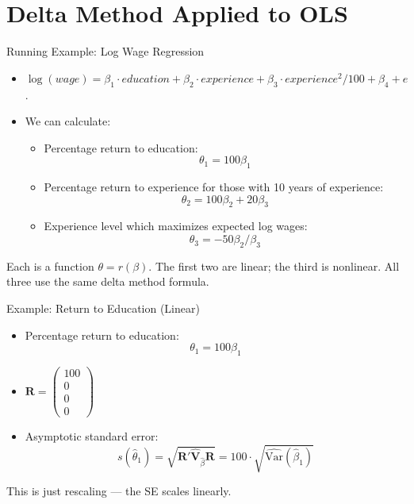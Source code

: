 \documentclass[aspectratio=169, handout, t]{beamer}
\numberwithin{equation}{section}
\begin{document}
\section{Delta Method Applied to OLS}
\setcounter{subsection}{1}

\begin{frame}{Running Example: Log Wage Regression}
\begin{itemize}
\item $\log(wage)=\beta_1 \cdot education+\beta_2 \cdot experience+\beta_3 \cdot experience^2/100+\beta_4+e$.
\item We can calculate:
\begin{itemize}
\item Percentage return to education:
$$\theta_1=100\beta_1$$
\item Percentage return to experience for those with 10 years of experience:
$$\theta_2=100\beta_2+20\beta_3$$
\item Experience level which maximizes expected log wages:
$$\theta_3=-50\beta_2/\beta_3$$
\end{itemize}
\end{itemize}

\pause

Each is a function $\theta = r(\beta)$. The first two are linear; the third is nonlinear. All three use the same delta method formula.

\end{frame}


\begin{frame}{Example: Return to Education (Linear)}
\begin{itemize}
\item Percentage return to education:
$$\theta_1=100\beta_1$$
\item $\bm{R}=\begin{pmatrix}100\\ 0\\ 0\\ 0\end{pmatrix}$
\item Asymptotic standard error:
\[
s(\hat{\theta}_1) = \sqrt{\bm{R}' \hat{\bm{V}}_{\hat{\beta}} \bm{R}} = 100 \cdot \sqrt{\hat{\text{Var}}(\hat{\beta}_1)}
\]
\end{itemize}

This is just rescaling --- the SE scales linearly.

\end{frame}
\end{document}
